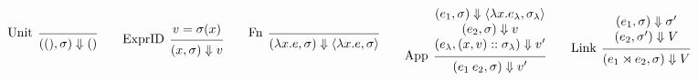 \documentclass{article}
\theoremstyle{definition}
\newcommand*{\cons}{::}
\newcommand*{\ctx}{\sigma}
\newcommand*{\semarrow}{\Downarrow}
\newcommand*{\link}[2]{{#1}\rtimes{#2}}
\begin{document}
\begin{figure}[h!]
  \footnotesize
  \begin{flushright}
    \fbox{$(e,\ctx)\semarrow V$}
  \end{flushright}
  \centering
  \vspace{0pt} %
  \[
    \begin{prooftree}
      \infer[left label=Unit]0{
      ((),\ctx)
      \semarrow
      ()
      }
    \end{prooftree}\qquad
    \begin{prooftree}
      \hypo{v=\ctx(x)}
      \infer[left label=ExprID]1{
      (x, \ctx)
      \semarrow
      v
      }
    \end{prooftree}\qquad
    \begin{prooftree}
      \infer[left label=Fn]0{
      (\lambda x.e, \ctx)
      \semarrow
      \langle\lambda x.e, \ctx\rangle
      }
    \end{prooftree}\qquad
    \begin{prooftree}
      \hypo{
        \begin{matrix}
          (e_{1}, \ctx)
          \semarrow
          \langle\lambda x.e_{\lambda}, \ctx_{\lambda}\rangle \\
          (e_{2}, \ctx)
          \semarrow
          v                                                   \\
          (e_{\lambda}, (x, v)\cons \ctx_{\lambda})
          \semarrow
          v'
        \end{matrix}
      }
      \infer[left label={App}]1{
      (e_{1}\:e_{2}, \ctx)
      \semarrow
      v'
      }
    \end{prooftree}\qquad
    \begin{prooftree}
      \hypo{
        \begin{matrix}
          (e_{1}, \ctx)
          \semarrow
          \ctx' \\
          (e_{2}, \ctx')
          \semarrow
          V
        \end{matrix}
      }
      \infer[left label=Link]1{
      (\link{e_{1}}{e_{2}}, \ctx)
      \semarrow
      V
      }
    \end{prooftree}
  \]


\end{figure}
\end{document}
